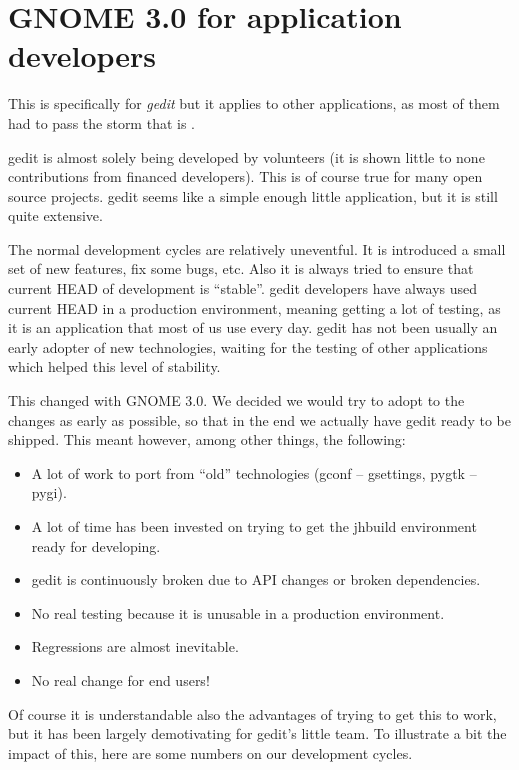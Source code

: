 
\chapter[GNOME 3.0 for application developers]{GNOME 3.0 for application developers\cite{website:gnome-3-0-for-application-developers}}\label{GNOME3AppDevs}

This is specifically for \emph{gedit} but it applies to other \GNOME applications, as most of them had to pass the storm that is .

gedit is almost solely being developed by volunteers (it is shown little to none contributions from financed developers). This is of course true for many open source projects. gedit seems like a simple enough little application, but it is still quite extensive.

The normal development cycles are relatively uneventful. It is introduced a small set of new features, fix some bugs, etc. Also it is always tried to ensure that current HEAD of development is ``stable''. gedit developers have always used current HEAD in a production environment, meaning getting a lot of testing, as it is an application that most of us use every day. gedit has not been usually an early adopter of new technologies, waiting for the testing of other applications which helped this level of stability.

This changed with GNOME 3.0. We decided we would try to adopt to the changes as early as possible, so that in the end we actually have gedit ready to be shipped. This meant however, among other things, the following:
\begin{itemize}
  \item A lot of work to port from ``old'' technologies (gconf – gsettings, pygtk – pygi).
  \item A lot of time has been invested on trying to get the jhbuild environment ready for developing.
  \item gedit is continuously broken due to API changes or broken dependencies.
  \item No real testing because it is unusable in a production environment.
  \item Regressions are almost inevitable.
  \item No real change for end users!
\end{itemize}

Of course it is understandable also the advantages of trying to get this to work, but it has been largely demotivating for gedit's little team. To illustrate a bit the impact of this, here are some numbers on our development cycles.

